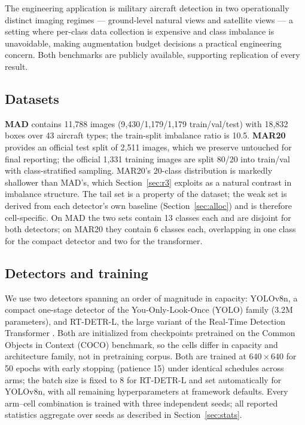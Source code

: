 \documentclass[preprint,12pt,authoryear]{elsarticle}
\begin{document}
The engineering application is military aircraft detection in two
operationally distinct imaging regimes --- ground-level natural views
and satellite views --- a setting where per-class data collection is
expensive and class imbalance is unavoidable, making augmentation budget
decisions a practical engineering concern. Both benchmarks are publicly
available, supporting replication of every result.

\subsection{Datasets}\label{sec:datasets}

\textbf{MAD} \citep[Military Aircraft Detection, natural side/ground
views; public;][]{rookieengg2023mad} contains 11{,}788 images
(9{,}430/1{,}179/1{,}179 train/val/test) with 18{,}832 boxes over 43
aircraft types; the train-split imbalance ratio is 10.5. \textbf{MAR20}
\citep[Military Aircraft Recognition dataset, satellite view, horizontal
boxes; public;][]{yu2023mar20} provides an official test split of
2{,}511 images, which we preserve untouched for final reporting; the
official 1{,}331 training images are split 80/20 into train/val with
class-stratified sampling. MAR20's 20-class distribution is markedly
shallower than MAD's, which Section~\ref{sec:r3} exploits as a natural
contrast in imbalance structure. The tail set is a property of the
dataset; the weak set is derived from each detector's own baseline
(Section~\ref{sec:alloc}) and is therefore cell-specific. On MAD the two
sets contain 13 classes each and are disjoint for both detectors; on
MAR20 they contain 6 classes each, overlapping in one class for the
compact detector and two for the transformer.

\subsection{Detectors and training}\label{sec:detectors}

We use two detectors spanning an order of magnitude in capacity:
YOLOv8n, a compact one-stage detector of the You-Only-Look-Once (YOLO)
family (3.2M parameters), and RT-DETR-L, the large variant of the
Real-Time Detection Transformer \citep[32M parameters;][]{zhao2024rtdetr}.
Both are initialized from checkpoints pretrained on the Common Objects
in Context (COCO) benchmark, so the cells differ in capacity and
architecture family, not in pretraining corpus. Both are trained at
$640\times640$ for 50 epochs with early stopping (patience 15) under
identical schedules across arms; the batch size is fixed to 8 for
RT-DETR-L and set automatically for YOLOv8n, with all remaining
hyperparameters at framework defaults. Every arm--cell combination is
trained with three independent seeds; all reported statistics aggregate
over seeds as described in Section~\ref{sec:stats}.
\end{document}
